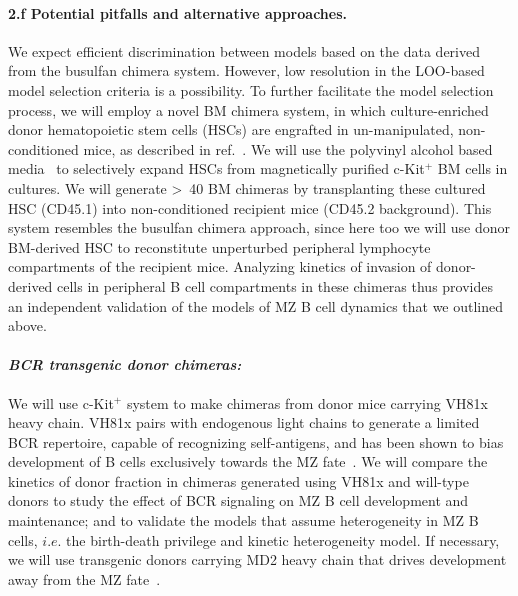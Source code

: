 \documentclass[11pt]{article}
\newcommand\ie{$\textit{i.e.}$}
\newcommand{\para}[1]{\vspace*{-4.5mm}\paragraph{#1}}
\begin{document}
\para{2.f Potential pitfalls and alternative approaches.}
We expect efficient discrimination between models based on the data derived from the busulfan chimera system.
However, low resolution in the LOO-based model selection criteria is a possibility.
To further facilitate the model selection process, we will employ a novel BM chimera system, in which culture-enriched donor hematopoietic stem cells (HSCs) are engrafted in un-manipulated, non-conditioned mice, as described in ref.~.
We will use the polyvinyl alcohol based media~\cite{Wilkinson_2020} to selectively expand HSCs from magnetically purified c-Kit$^+$ BM cells in cultures.
We will generate >~40 BM chimeras by transplanting these cultured HSC (CD45.1) into non-conditioned recipient mice (CD45.2 background).
This system resembles the busulfan chimera approach, since here too we will use donor BM-derived HSC to reconstitute {unperturbed peripheral lymphocyte compartments} of the recipient mice.
Analyzing kinetics of invasion of donor-derived cells in peripheral B cell compartments in these chimeras thus provides an {independent validation} of the models of MZ B cell dynamics that we outlined above.

\para{\textit{BCR transgenic donor chimeras:}}
We will use c-Kit$^+$ system to make chimeras from donor mice carrying VH81x heavy chain.
VH81x pairs with endogenous light chains to generate a limited BCR repertoire, capable of recognizing self-antigens, and has been shown to bias development of B cells exclusively towards the MZ fate~\cite{Martin_2000, Hammad_2017}.
We will compare the kinetics of donor fraction in chimeras generated using VH81x and will-type donors to study the effect of BCR signaling on MZ B cell development and maintenance; and to validate the models that assume heterogeneity in MZ B cells, {\ie} the birth-death privilege and kinetic heterogeneity model. %
If necessary, we will use transgenic donors carrying MD2 heavy chain that drives development away from the MZ fate~\cite{Martin_2000}.
\end{document}
